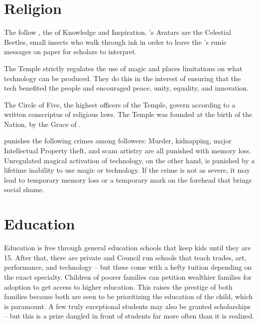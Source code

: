 \documentclass[blue]{GL2020}
\begin{document}
\section*{Religion}
The \pTechies{} follow \cTechGod{}, the \cTechGod{\God} of Knowledge and Inspiration. \cTechGod{}'s Avatars are the Celestial Beetles, small insects who walk through ink in order to leave the \cTechGod{\God}’s runic messages on paper for scholars to interpret.  

The Temple strictly regulates the use of magic and places limitations on what technology can be produced. They do this in the interest of ensuring that the tech benefited the people and encouraged peace, unity, equality, and innovation.

The Circle of Five, the highest officers of the Temple, govern according to a written conscriptus of religious laws. The Temple was founded at the birth of the Nation, by the Grace of \cTechGod{}.

\cTechGod{} punishes the following crimes among \cTechGod{\their} followers:  Murder, kidnapping, major Intellectual Property theft, and scam artistry are all punished with memory loss. Unregulated magical activation of technology, on the other hand, is punished by a lifetime inability to use magic or technology. If the crime is not as severe, it may lead to temporary memory loss or a temporary mark on the forehead that brings social shame.

	
\section{Education}
Education is free through general education schools that keep kids until they are 15. After that, there are private and Council run schools that teach trades, art, performance, and technology -- but these come with a hefty tuition depending on the exact specialty. Children of poorer families can petition wealthier families for adoption to get access to higher education. This raises the prestige of both families because both are seen to be prioritizing the education of the child, which is paramount. A few truly exceptional students may also be granted scholarships -- but this is a prize dangled in front of students far more often than it is realized. 
\end{document}
